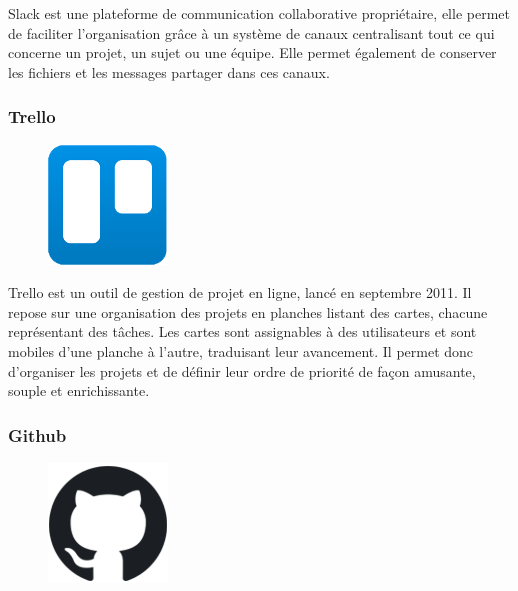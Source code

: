 Slack est une plateforme de communication collaborative propriétaire, elle 
permet de faciliter l’organisation grâce à un système de canaux centralisant 
tout ce qui concerne un projet, un sujet ou une équipe. Elle permet également 
de conserver les fichiers et les messages partager dans ces canaux\cite{37}. 

\clearpage

\subsubsection*{Trello}
\begin{figure}
    \vspace{-22pt}
    \begin{center}
        \includegraphics[scale=0.36]{images/logo/trello.png}
        \label{fig63}
    \end{center}
    \vspace{-20pt}
    \vspace{-10pt}
\end{figure}

Trello est un outil de gestion de projet en ligne, lancé en septembre 2011. Il 
repose sur une organisation des projets en planches listant des cartes, chacune 
représentant des tâches. Les cartes sont assignables à des utilisateurs et sont 
mobiles d’une planche à l’autre, traduisant leur avancement. Il permet donc 
d’organiser les projets et de définir leur ordre de priorité de façon amusante, 
souple et enrichissante\cite{38}.

\subsubsection*{Github}
\begin{figure}
    \vspace{-22pt}
    \begin{center}
        \includegraphics[scale=0.36]{images/logo/github.png}
        \label{fig64}
    \end{center}
    \vspace{-20pt}
    \vspace{-10pt}
\end{figure}


